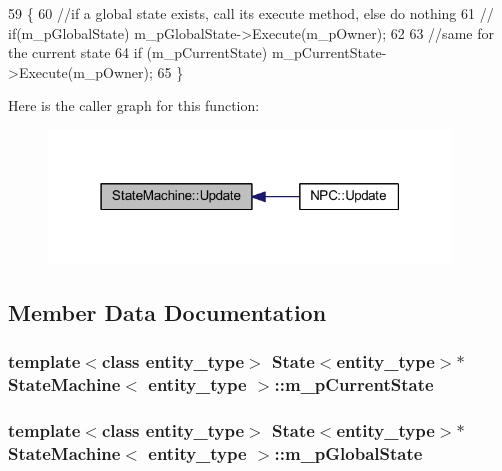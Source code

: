 \begin{DoxyCode}
59   \{
60     \textcolor{comment}{//if a global state exists, call its execute method, else do nothing}
61    \textcolor{comment}{// if(m\_pGlobalState)   m\_pGlobalState->Execute(m\_pOwner);}
62 
63     \textcolor{comment}{//same for the current state}
64     \textcolor{keywordflow}{if} (m_pCurrentState) m_pCurrentState->Execute(m_pOwner);
65   \}
\end{DoxyCode}


Here is the caller graph for this function\+:\nopagebreak
\begin{figure}[H]
\begin{center}
\leavevmode
\includegraphics[width=303pt]{d4/dd0/class_state_machine_a24b1f38171537058ab8040b3b42adb6c_icgraph}
\end{center}
\end{figure}




\subsection{Member Data Documentation}
\subsubsection[{m\+\_\+p\+Current\+State}]{\setlength{\rightskip}{0pt plus 5cm}template$<$class entity\+\_\+type$>$ {\bf State}$<$entity\+\_\+type$>$$\ast$ {\bf State\+Machine}$<$ entity\+\_\+type $>$\+::m\+\_\+p\+Current\+State\hspace{0.3cm}{\ttfamily [private]}}\label{class_state_machine_ad29cc24d3a4f7a18433f2312bfe62f6a}
\subsubsection[{m\+\_\+p\+Global\+State}]{\setlength{\rightskip}{0pt plus 5cm}template$<$class entity\+\_\+type$>$ {\bf State}$<$entity\+\_\+type$>$$\ast$ {\bf State\+Machine}$<$ entity\+\_\+type $>$\+::m\+\_\+p\+Global\+State\hspace{0.3cm}{\ttfamily [private]}}\label{class_state_machine_a0aae48f0742d736deb237662a7668bd1}
